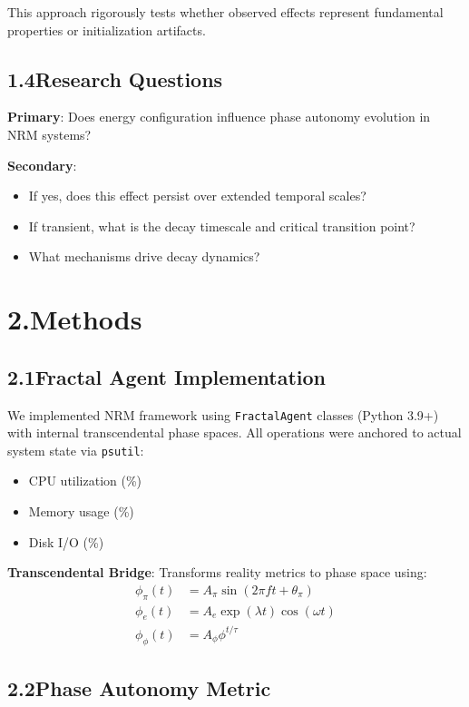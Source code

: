 \documentclass[11pt]{article}
\begin{document}
This approach rigorously tests whether observed effects represent fundamental properties or initialization artifacts.

\subsection*{1.4\quad Research Questions}

\noindent\textbf{Primary}: Does energy configuration influence phase autonomy evolution in NRM systems?

\noindent\textbf{Secondary}:
\begin{itemize}
    \item If yes, does this effect persist over extended temporal scales?
    \item If transient, what is the decay timescale and critical transition point?
    \item What mechanisms drive decay dynamics?
\end{itemize}

\section*{2.\quad Methods}

\subsection*{2.1\quad Fractal Agent Implementation}

We implemented NRM framework using \texttt{FractalAgent} classes (Python 3.9+) with internal transcendental phase spaces. All operations were anchored to actual system state via \texttt{psutil}:
\begin{itemize}
    \item CPU utilization (\%)
    \item Memory usage (\%)
    \item Disk I/O (\%)
\end{itemize}

\noindent\textbf{Transcendental Bridge}: Transforms reality metrics to phase space using:
\begin{align}
\phi_\pi(t) &= A_\pi \sin(2\pi f t + \theta_\pi) \\
\phi_e(t) &= A_e \exp(\lambda t) \cos(\omega t) \\
\phi_\phi(t) &= A_\phi \phi^{t/\tau}
\end{align}

\subsection*{2.2\quad Phase Autonomy Metric}
\end{document}
